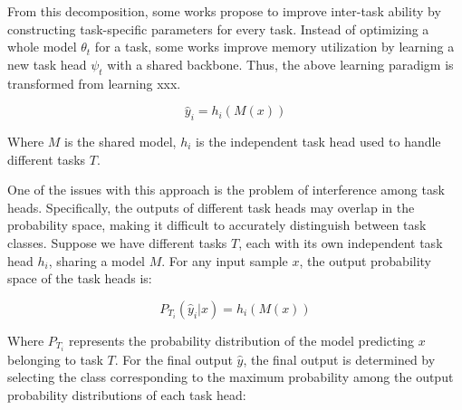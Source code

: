 From this decomposition, some works propose to improve inter-task ability by constructing task-specific parameters for every task. Instead of optimizing a whole model $\theta_t$ for a task, some works improve memory utilization by learning a new task head $\psi_t$ with a shared backbone. Thus, the above learning paradigm is transformed from learning xxx.


\iffalse
{}

\iffalse
To overcome catastrophic forgetting, some works solve this problem from a scheme named, ``new task new model'', in class incremental learning. In detail, this kind of method trains a new model for every new incoming task. Some works improve memory utilization by learning a new task head instead of a whole model. In this solution scheme for the class incremental learning, for a given input \(x\) and task \(T\), result \(\hat{y}_i\) can be defined as:
\fi


\[\hat{y}_i=h_i(M(x))\]

Where \(M\) is the shared model, \(h_i\) is the independent task head used to handle different tasks \(T\).


One of the issues with this approach is the problem of interference among task heads. Specifically, the outputs of different task heads may overlap in the probability space, making it difficult to accurately distinguish between task classes. Suppose we have different tasks \(T\), each with its own independent task head \(h_i\), sharing a model \(M\). For any input sample \(x\), the output probability space of the task heads is:

\[P_{T_i}(\hat{y}_i|x)=h_i(M(x))\]

Where \(P_{T_i}\) represents the probability distribution of the model predicting \(x\) belonging to task \(T\). For the final output \(\hat{y}\), the final output is determined by selecting the class corresponding to the maximum probability among the output probability distributions of each task head:

